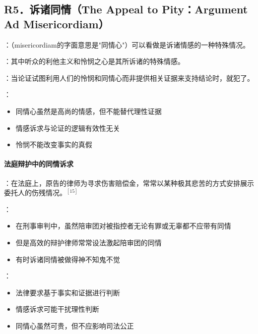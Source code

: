 \subsection{R5．诉诸同情（The Appeal to Pity：Argument Ad Misericordiam）}

\begin{theorembox}[title=诉诸同情谬误的定义与特征]
：（misericordiam的字面意思是"同情心"）可以看做是诉诸情感的一种特殊情况。

：其中听众的利他主义和怜悯之心是其所诉诸的特殊情感。

：当论证试图利用人们的怜悯和同情心而非提供相关证据来支持结论时，就犯了。

：
\begin{itemize}
  \item 同情心虽然是高尚的情感，但不能替代理性证据
  \item 情感诉求与论证的逻辑有效性无关
  \item 怜悯不能改变事实的真假
\end{itemize}
\end{theorembox}

\paragraph{法庭辩护中的同情诉求}
\begin{examplebox}[title=法庭中的同情诉求]
：在法庭上，原告的律师为寻求伤害赔偿金，常常以某种极其悲苦的方式安排展示委托人的伤残情况。$^{[15]}$

：
\begin{itemize}
  \item 在刑事审判中，虽然陪审团对被指控者无论有罪或无辜都不应带有同情
  \item 但是高效的辩护律师常常设法激起陪审团的同情
  \item 有时诉诸同情被做得神不知鬼不觉
\end{itemize}

：
\begin{itemize}
  \item 法律要求基于事实和证据进行判断
  \item 情感诉求可能干扰理性判断
  \item 同情心虽然可贵，但不应影响司法公正
\end{itemize}
\end{examplebox}

